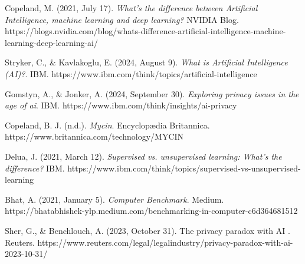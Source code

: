 \documentclass[licencjacka,en]{pracamgr}
\begin{document}
\begin{thebibliography}{99}

Copeland, M. (2021, July 17). \textit{What’s the difference between Artificial Intelligence, machine learning and deep learning?} NVIDIA Blog. https://blogs.nvidia.com/blog/whats-difference-artificial-intelligence-machine-learning-deep-learning-ai/

Stryker, C., \& Kavlakoglu, E. (2024, August 9). \textit{What is Artificial Intelligence (AI)?}. IBM. https://www.ibm.com/think/topics/artificial-intelligence

Gomstyn, A., \& Jonker, A. (2024, September 30). \textit{Exploring privacy issues in the age of ai}. IBM. https://www.ibm.com/think/insights/ai-privacy

Copeland, B. J. (n.d.). \textit{Mycin}. Encyclopædia Britannica. https://www.britannica.com/technology/MYCIN

Delua, J. (2021, March 12). \textit{Supervised vs. unsupervised learning: What’s the difference?} IBM. https://www.ibm.com/think/topics/supervised-vs-unsupervised-learning

Bhat, A. (2021, January 5). \textit{Computer Benchmark}. Medium. https://bhatabhishek-ylp.medium.com/benchmarking-in-computer-c6d364681512

Sher, G., \& Benchlouch, A. (2023, October 31). The privacy paradox with AI . Reuters. https://www.reuters.com/legal/legalindustry/privacy-paradox-with-ai-2023-10-31/


\end{thebibliography}
\end{document}

